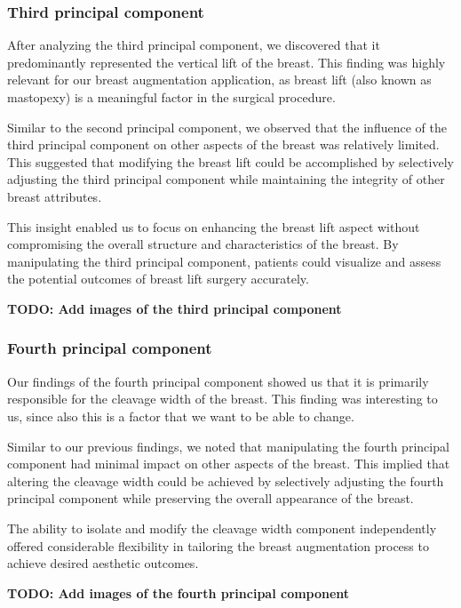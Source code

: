 \subsubsection{Third principal component}

After analyzing the third principal component, we discovered that it predominantly represented the vertical lift of the breast. This finding was highly relevant for our breast augmentation application, 
as breast lift (also known as mastopexy) is a meaningful factor in the surgical procedure.

Similar to the second principal component, we observed that the influence of the third principal component on other aspects of the breast was relatively limited. 
This suggested that modifying the breast lift could be accomplished by selectively adjusting the third principal component while maintaining the integrity of other breast attributes.

This insight enabled us to focus on enhancing the breast lift aspect without compromising the overall structure and characteristics of the breast. By manipulating the third principal component, 
patients could visualize and assess the potential outcomes of breast lift surgery accurately.

\textbf{TODO: Add images of the third principal component}

\subsubsection{Fourth principal component}

Our findings of the fourth principal component showed us that it is primarily responsible for the cleavage width of the breast. This finding was interesting to us, since also this is a factor that we want
to be able to change.

Similar to our previous findings, we noted that manipulating the fourth principal component had minimal impact on other aspects of the breast. This implied that altering the cleavage width could 
be achieved by selectively adjusting the fourth principal component while preserving the overall appearance of the breast.

The ability to isolate and modify the cleavage width component independently offered considerable flexibility in tailoring the breast augmentation process to achieve desired aesthetic outcomes. 

\textbf{TODO: Add images of the fourth principal component}

